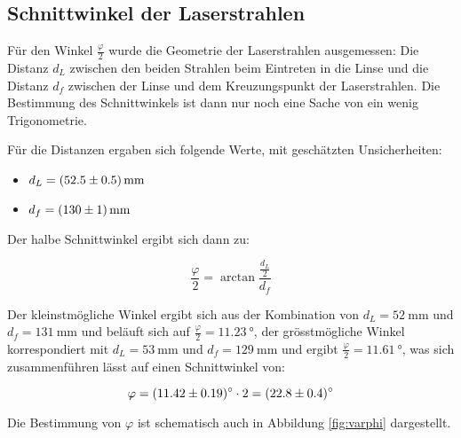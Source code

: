 \subsection{Schnittwinkel der Laserstrahlen}
\label{subsec:varphi}

\begin{minipage}[t]{\textwidth}
    \centering
    \resizebox{.75\textwidth}{!}{}
    \label{fig:varphi}
\end{minipage}

F\"ur  den Winkel  $\frac{\varphi}{2}$ wurde  die Geometrie  der Laserstrahlen
ausgemessen: Die Distanz $d_L$ zwischen den  beiden Strahlen beim Eintreten in
die Linse und die Distanz $d_f$  zwischen der Linse und dem Kreuzungspunkt der
Laserstrahlen. Die Bestimmung des Schnittwinkels ist  dann nur noch eine Sache
von ein wenig Trigonometrie.

F\"ur   die  Distanzen   ergaben  sich   folgende  Werte,   mit  gesch\"atzten
Unsicherheiten:

\begin{itemize}
    \item
        $ d_L = \SI{52.5 \pm 0.5}{\milli\meter}$
    \item
        $ d_f = \SI{130 \pm 1}{\milli\meter}$
\end{itemize}

Der halbe Schnittwinkel ergibt sich dann zu:

\begin{equation}
    \label{eq:varphi_half}
    \frac{\varphi}{2} = \arctan \frac{\frac{d_L}{2}}{d_f}
\end{equation}

Der kleinstm\"ogliche Winkel ergibt sich aus der Kombination von
$d_L = \SI{52}{\milli\meter}$
und
$d_f = \SI{131}{\milli\meter}$
und
bel\"auft sich auf
$\frac{\varphi}{2} = \SI{11.23}{\degree}$,
der gr\"osstm\"ogliche Winkel korrespondiert mit
$d_L = \SI{53}{\milli\meter}$
und
$d_f = \SI{129}{\milli\meter}$
und ergibt
$\frac{\varphi}{2} = \SI{11.61}{\degree}$,
was sich zusammenf\"uhren l\"asst auf einen Schnittwinkel von:

\begin{equation}
    \label{eq:varphi_result}
    \varphi = \SI{11.42 \pm 0.19}{\degree} \cdot 2 = \SI{22.8 \pm 0.4}{\degree}
\end{equation}

Die   Bestimmung   von   $\varphi$   ist   schematisch   auch   in   Abbildung
\ref{fig:varphi} dargestellt.

